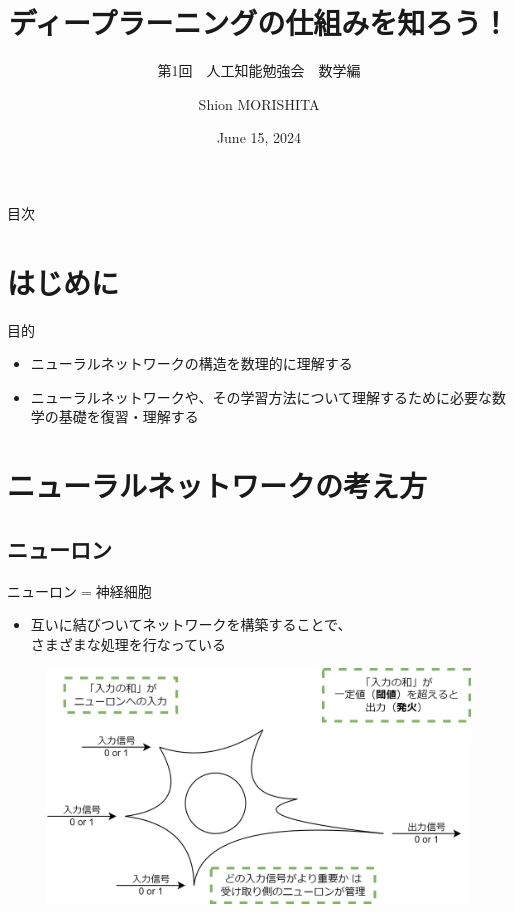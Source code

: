 \documentclass[dvipdfmx,aspectratio=169]{beamer}
\title{ディープラーニングの仕組みを知ろう！}
\subtitle{第1回　人工知能勉強会　数学編}
\author{Shion MORISHITA}
\institute{}
\date{June 15, 2024}
\begin{document}
	\begin{frame}[plain]
	    \maketitle
	\end{frame}
		
	\begin{frame}[shrink]{目次}
		\vspace{1em}
		\tableofcontents
	\end{frame}
	
	\section{はじめに}
	\begin{frame}{目的}
		\begin{itemize}
			\item ニューラルネットワークの構造を数理的に理解する
			\item ニューラルネットワークや、その学習方法について理解するために必要な数学の基礎を復習・理解する
		\end{itemize}
	\end{frame}

	\section{ニューラルネットワークの考え方}
	\subsection{ニューロン}
	\begin{frame}{ニューロン$ = $神経細胞}
		\begin{itemize}
			\item 互いに結びついてネットワークを構築することで、\\さまざまな処理を行なっている
		\end{itemize}

		\begin{figure}
			\centering
			\includegraphics[width=0.6\linewidth]{img/function-of-neurons}
		\end{figure}
	\end{frame}
	
\end{document}

